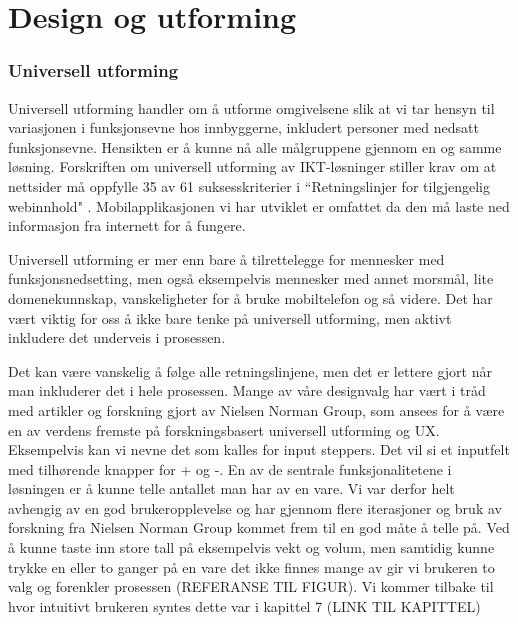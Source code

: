 \chapter{\textbf{Design og utforming}}

\subsection{\textbf{Universell utforming}}
Universell utforming handler om å utforme omgivelsene slik at vi tar hensyn til variasjonen i funksjonsevne hos innbyggerne, inkludert personer med nedsatt funksjonsevne.\cite{digiuniversell} Hensikten er å kunne nå alle målgruppene gjennom en og samme løsning. Forskriften om universell utforming av IKT-løsninger stiller krav om at nettsider må oppfylle 35 av 61 suksesskriterier i “Retningslinjer for tilgjengelig webinnhold" \cite{digiwcag}. Mobilapplikasjonen vi har utviklet er omfattet da den må laste ned informasjon fra internett for å fungere.

Universell utforming er mer enn bare å tilrettelegge for mennesker med funksjonsnedsetting, men også eksempelvis mennesker med annet morsmål, lite domenekunnskap, vanskeligheter for å bruke mobiltelefon og så videre. Det har vært viktig for oss å ikke bare tenke på universell utforming, men aktivt inkludere det underveis i prosessen.

Det kan være vanskelig å følge alle retningslinjene, men det er lettere gjort når man inkluderer det i hele prosessen. Mange av våre designvalg har vært i tråd med artikler og forskning gjort av Nielsen Norman Group, som ansees for å være en av verdens fremste på forskningsbasert universell utforming og UX. Eksempelvis kan vi nevne det som kalles for input steppers. Det vil si et inputfelt med tilhørende knapper for + og -. En av de sentrale funksjonalitetene i løsningen er å kunne telle antallet man har av en vare. Vi var derfor helt avhengig av en god brukeropplevelse og har gjennom flere iterasjoner og bruk av forskning fra Nielsen Norman Group\cite{nngsteppers} kommet frem til en god måte å telle på. Ved å kunne taste inn store tall på eksempelvis vekt og volum, men samtidig kunne trykke en eller to ganger på en vare det ikke finnes mange av gir vi brukeren to valg og forenkler prosessen (REFERANSE TIL FIGUR). Vi kommer tilbake til hvor intuitivt brukeren syntes dette var i kapittel 7 (LINK TIL KAPITTEL)

